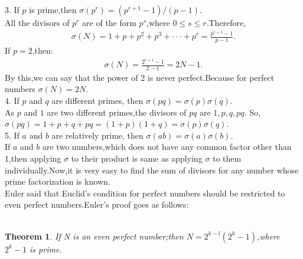 \documentclass[a4paper,reqno,11pt]{book}
\theoremstyle{plain}%
\newtheorem{thm}{Theorem}[chapter]
\theoremstyle{definition}
\begin{document}
3. If $p$ is prime,then $\sigma(p^r)=(p^{r+1}-1)/(p-1)$.\\
All the divisors of $p^r$ are of the form $p^s$,where $0\leq s \leq r$.Therefore,
\begin{eqnarray*}
    \sigma(N)=1+p+p^2+p^3+\cdot\cdot\cdot+p^r=\frac{p^{r+1}-1}{p-1}.
\end{eqnarray*}
If $p=2$,then:
\begin{eqnarray*}
    \sigma(N)=\frac{2^{r+1}-1}{2-1}=2N-1.
\end{eqnarray*}
By this,we can say that the power of 2 is never perfect.Because for perfect numbers $\sigma(N)=2N$.\\
4. If $p$ and $q$ are different primes, then $\sigma(pq)=\sigma(p)\sigma(q)$.\\
As $p$ and $1$ are two different primes,the divisors of $pq$ are $1,p,q,pq $. So, $\sigma(pq)=1+p+q+pq=(1+p)(1+q)=\sigma(p)\sigma(q)$.\\
5. If $a$ and $b$ are relatively prime, then $\sigma(ab)=\sigma(a)\sigma(b)$.\\
If $a$ and $b$ are two numbers,which does not have any common factor other than 1,then applying $\sigma$ to their product is same as applying $\sigma$ to them individually.Now,it is very easy to find the sum of divisors for any number whose prime factorization is known.\\
Euler said that Euclid's condition for perfect numbers should be restricted to even perfect numbers.Euler's proof goes as follows:\\
\\
\begin{thm}\label{thm:Type 2}
\textit{If N is an even perfect number;then $N=2^{k-l}(2^k-1)$,where $2^k-1$ is prime}.
\end{thm}
\end{document}
